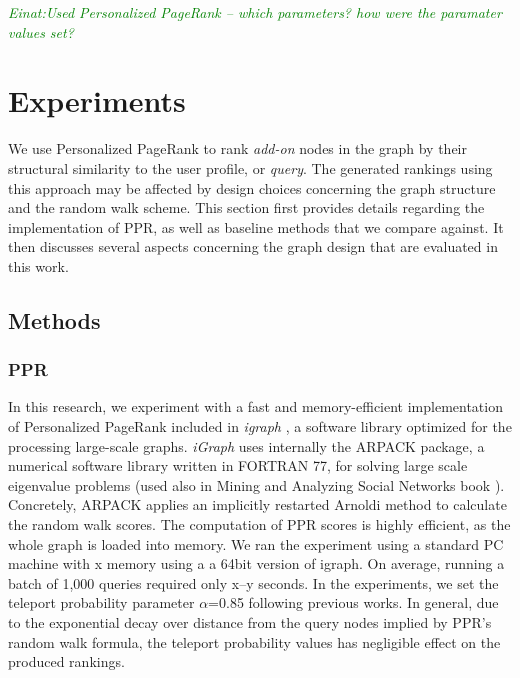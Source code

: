 \documentclass[11pt,oneside]{book}
\let\Oldsection\section
\renewcommand{\section}{\FloatBarrier\Oldsection}
\let\Oldsubsection\subsection
\renewcommand{\subsection}{\FloatBarrier\Oldsubsection}
\let\Oldsubsubsection\subsubsection
\renewcommand{\subsubsection}{\FloatBarrier\Oldsubsubsection}
\begin{document}
\textcolor{green}{\textit{Einat:Used Personalized PageRank -- which parameters? how were the paramater
values set?}}
\fi


\section{Experiments}
\label{sec:experiments}

We use Personalized PageRank to rank {\it add-on} nodes in
the graph by their structural similarity to the user profile, or {\it
  query}. The generated rankings using this approach may be affected
by design choices concerning the graph structure and the random walk scheme. This section first provides details regarding the implementation of PPR, as well as baseline methods that we compare against. It then discusses several aspects concerning the graph design that are evaluated in this work.

\subsection{Methods}
\label{sec:methods}

\subsubsection{PPR} In this research, we experiment with a fast and memory-efficient implementation of Personalized PageRank included in {\it igraph} \citep{igraph}, a software library optimized for the processing large-scale graphs. {\it iGraph} uses internally the ARPACK package, a numerical software library written in FORTRAN 77, for solving large
scale eigenvalue problems (used also in Mining and Analyzing Social
Networks book \citep{ting2004minig}). Concretely, ARPACK applies an implicitly restarted Arnoldi method to calculate the random walk scores. The computation of PPR scores is highly efficient, as the whole graph is loaded into memory. We ran the experiment using a standard PC machine with x memory using a a 64bit version of igraph. On average, running a batch of 1,000 queries required only x--y seconds. In the experiments, we set the teleport probability parameter $\alpha$=0.85 following previous works. In general, due to the exponential decay over distance from the query nodes implied by PPR's random walk formula, the teleport probability values has negligible effect on the produced rankings.
\end{document}
